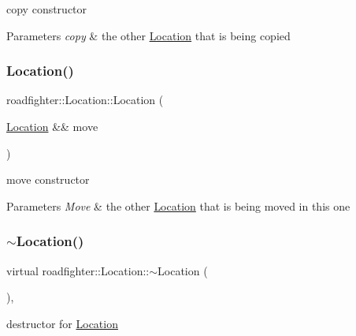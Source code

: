 copy constructor 
\begin{DoxyParams}{Parameters}
{\em copy} & the other \hyperlink{classroadfighter_1_1Location}{Location} that is being copied \\
\hline
\end{DoxyParams}
\mbox{\label{classroadfighter_1_1Location_a62ad632660a51914e36ec61bc8f3aa8d}} 
\subsubsection{\texorpdfstring{Location()}{Location()}\hspace{0.1cm}{\footnotesize\ttfamily [4/4]}}
{\footnotesize\ttfamily roadfighter\+::\+Location\+::\+Location (\begin{DoxyParamCaption}\item[{\hyperlink{classroadfighter_1_1Location}{Location} \&\&}]{move }\end{DoxyParamCaption})\hspace{0.3cm}{\ttfamily [default]}}

move constructor 
\begin{DoxyParams}{Parameters}
{\em Move} & the other \hyperlink{classroadfighter_1_1Location}{Location} that is being moved in this one \\
\hline
\end{DoxyParams}
\mbox{\label{classroadfighter_1_1Location_a074a1b1dd7011f53da1f1cd18669f074}} 
\subsubsection{\texorpdfstring{$\sim$\+Location()}{~Location()}}
{\footnotesize\ttfamily virtual roadfighter\+::\+Location\+::$\sim$\+Location (\begin{DoxyParamCaption}{ }\end{DoxyParamCaption})\hspace{0.3cm}{\ttfamily [virtual]}, {\ttfamily [default]}}

destructor for \hyperlink{classroadfighter_1_1Location}{Location} 

